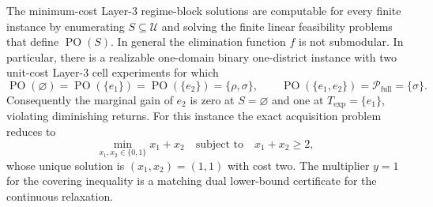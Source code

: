 The minimum-cost Layer-3 regime-block solutions are computable for every finite instance by enumerating \(S\subseteq\mathcal U\) and solving the finite linear feasibility problems that define \(\operatorname{PO}(S)\).  In general the elimination function \(f\) is not submodular.  In particular, there is a realizable one-domain binary one-district instance with two unit-cost Layer-3 cell experiments for which
\[
 \operatorname{PO}(\varnothing)=\operatorname{PO}(\{e_1\})
 =\operatorname{PO}(\{e_2\})=\{\rho,\sigma\},
 \qquad
 \operatorname{PO}(\{e_1,e_2\})=\mathcal P_{\mathrm{full}}=\{\sigma\}.
\]
Consequently the marginal gain of \(e_2\) is zero at \(S=\varnothing\) and one at \(T_{\mathrm{exp}}=\{e_1\}\), violating diminishing returns.  For this instance the exact acquisition problem reduces to
\[
 \min_{x_1,x_2\in\{0,1\}}x_1+x_2
 \quad\text{subject to}\quad x_1+x_2\geq2,
\]
whose unique solution is \((x_1,x_2)=(1,1)\) with cost two.
The multiplier \(y=1\) for the covering inequality is a matching dual lower-bound certificate for the continuous relaxation.